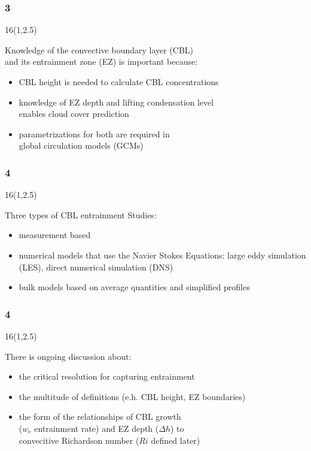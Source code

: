 \documentclass{beamer}
\newcommand\FrameText[1]{
\begin{textblock}{16}(1,2.5)
\raggedright #1
\end{textblock}}
\begin{document}
\begin{frame}
\frametitle{3}
\fontsize{12pt}{7.2}\selectfont
\FrameText{Knowledge of the convective boundary layer (CBL)\\
 and its entrainment zone (EZ) is important because:
 \vspace{10mm}
\begin{itemize}
\item CBL height is needed to calculate CBL concentrations
\vspace{10mm}
\item knowledge of EZ depth and lifting condensation level\\
 enables cloud cover prediction
\vspace{10mm}
\item parametrizations for both are required in\\ 
global circulation models (GCMs)
\end{itemize}
}
\end{frame}

\begin{frame}
\frametitle{4}
\fontsize{12pt}{7.2}\selectfont
\FrameText{Three types of CBL entrainment Studies:
\vspace{10mm}
\begin{itemize}
\item measurement based
\vspace{10mm} 
\item numerical models that use the Navier Stokes Equations: large eddy simulation (LES), direct numerical simulation (DNS)
\vspace{10mm}
\item bulk models based on average quantities and simplified profiles
\end{itemize}
}

\end{frame}
\begin{frame}
\frametitle{4}
\fontsize{12pt}{7.2}\selectfont
\FrameText{There is ongoing discussion about:
\vspace{10mm}
\begin{itemize}
\item the critical resolution for capturing entrainment
\vspace{10mm}
\item the multitude of definitions (e.h. CBL height, EZ boundaries)
\vspace{10mm}
\item the form of the relationships of CBL growth\\ 
($w_{e}$ entrainment rate) and EZ depth ($\Delta h$)  to \\
convecitive Richardson number ($Ri$ defined later)
\end{itemize}
}
\end{frame}
\end{document}
